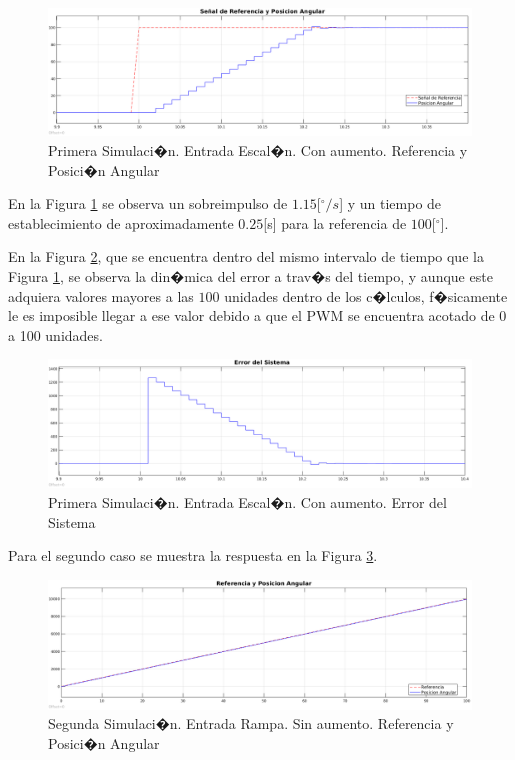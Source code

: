 \documentclass[10pt,a4paper]{book}
\begin{document}
\begin{figure}[H]
	\centering
		\includegraphics[scale=0.3]{Imagenes/SRD/Sim1_Img2.png}
	\caption{Primera Simulaci�n. Entrada Escal�n. Con aumento. Referencia y Posici�n Angular}
	\label{img:Sim1_Img2}
\end{figure}

En la Figura \ref{img:Sim1_Img2} se observa un sobreimpulso de $1.15$[$^\circ/s$] y un tiempo de establecimiento de aproximadamente $0.25$[s] para la referencia de $100$[$^\circ$].

En la Figura \ref{img:Sim1_Img3}, que se encuentra dentro del mismo intervalo de tiempo que la Figura \ref{img:Sim1_Img2}, se observa la din�mica del error a trav�s del tiempo, y aunque este adquiera valores mayores a las $100$ unidades dentro de los c�lculos, f�sicamente le es imposible llegar a ese valor debido a que el PWM se encuentra acotado de 0 a 100 unidades.

\begin{figure}[H]
	\centering
		\includegraphics[scale=0.3]{Imagenes/SRD/Sim1_Img3.png}
	\caption{Primera Simulaci�n. Entrada Escal�n. Con aumento. Error del Sistema}
	\label{img:Sim1_Img3}
\end{figure}

Para el segundo caso se muestra la respuesta en la Figura \ref{img:Sim2_Img1}.

\begin{figure}[H]
	\centering
		\includegraphics[scale=0.3]{Imagenes/SRD/Sim2_Img1.png}
	\caption{Segunda Simulaci�n. Entrada Rampa. Sin aumento. Referencia y Posici�n Angular}
	\label{img:Sim2_Img1}
\end{figure}
\end{document}

